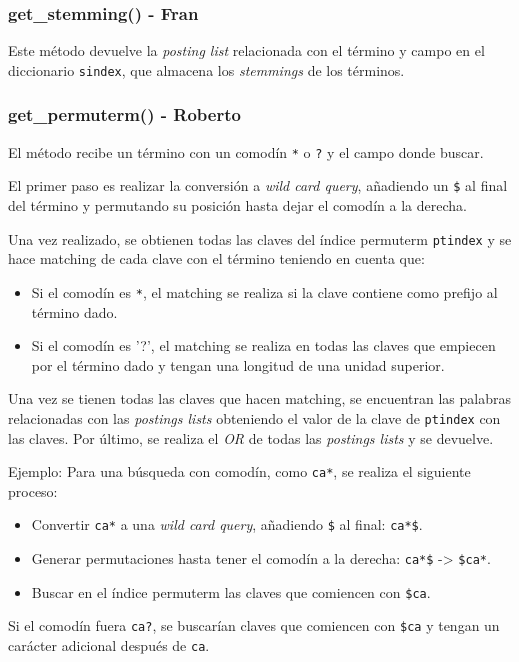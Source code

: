\documentclass[12pt,a4paper]{article}
\begin{document}
\subsubsection{get\_stemming() - Fran}
Este método devuelve la \textit{posting list} relacionada con el término y campo en el diccionario \texttt{sindex}, que almacena los \textit{stemmings} de los términos.

\subsubsection{get\_permuterm() - Roberto}
El método recibe un término con un comodín \texttt{*} o \texttt{?} y el campo donde buscar.

El primer paso es realizar la conversión a \textit{wild card query}, añadiendo un \texttt{\$} al final del término y permutando su posición hasta dejar el comodín a la derecha.

Una vez realizado, se obtienen todas las claves del índice permuterm \texttt{ptindex} y se hace matching de cada clave con el término teniendo en cuenta que:
\begin{itemize}
  \item Si el comodín es \texttt{*}, el matching se realiza si la clave contiene como prefijo al término dado.
  \item Si el comodín es '?', el matching se realiza en todas las claves que empiecen por el término dado y tengan una longitud de una unidad superior.
\end{itemize}

Una vez se tienen todas las claves que hacen matching, se encuentran las palabras relacionadas con las \textit{postings lists} obteniendo el valor de la clave de \texttt{ptindex} con las claves. Por último, se realiza el \textit{OR} de todas las \textit{postings lists} y se devuelve.

Ejemplo: Para una búsqueda con comodín, como \texttt{ca*}, se realiza el siguiente proceso:
\begin{itemize}
  \item Convertir \texttt{ca*} a una \textit{wild card query}, añadiendo \texttt{\$} al final: \texttt{ca*\$}.
  \item Generar permutaciones hasta tener el comodín a la derecha: \texttt{ca*\$} -> \texttt{\$ca*}.
  \item Buscar en el índice permuterm las claves que comiencen con \texttt{\$ca}.
\end{itemize}

Si el comodín fuera \texttt{ca?}, se buscarían claves que comiencen con \texttt{\$ca} y tengan un carácter adicional después de \texttt{ca}.
\end{document}
